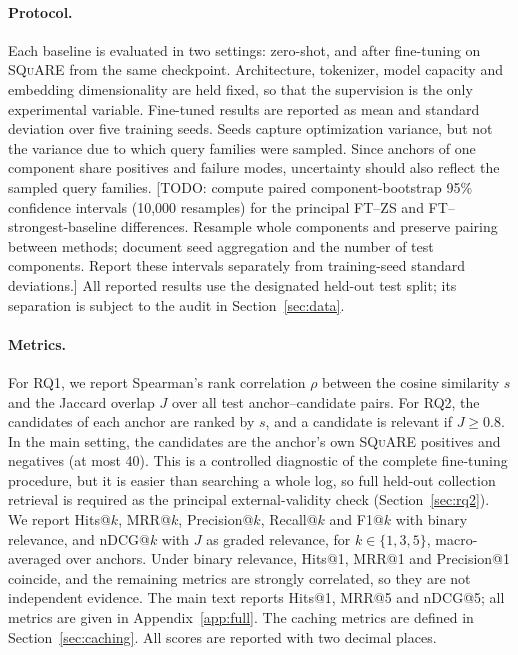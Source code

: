 \documentclass[runningheads]{llncs}
\newcommand{\squareds}{\textsc{SQuARE}}
\newcommand{\hp}[1]{{\color{red!75!black}#1}}
\begin{document}
\paragraph{Protocol.}
Each baseline is evaluated in two settings: zero-shot, and after fine-tuning
on \squareds{} from the same checkpoint. Architecture, tokenizer, model
capacity and embedding dimensionality are held fixed, so that the supervision
is the only experimental variable. Fine-tuned results are reported as mean and
standard deviation over five training seeds. Seeds capture optimization
variance, but not the variance due to which query families were sampled.
Since anchors of one component share positives and failure modes,
uncertainty should also reflect the sampled query families.
\hp{[TODO: compute paired component-bootstrap 95\% confidence intervals
(10,000 resamples) for the principal FT--ZS and FT--strongest-baseline
differences. Resample whole components and preserve pairing between methods;
document seed aggregation and the number of test components. Report these
intervals separately from training-seed standard deviations.]}
All reported results use the designated held-out test split; its separation
is subject to the audit in Section~\ref{sec:data}.

\paragraph{Metrics.}
For RQ1, we report Spearman's rank correlation $\rho$ between the cosine
similarity $s$ and the Jaccard overlap $J$ over all test anchor--candidate
pairs. For RQ2, the candidates of each anchor are ranked by $s$, and a
candidate is relevant if $J \geq 0.8$. In the main setting, the candidates are
the anchor's own \squareds{} positives and negatives (at most 40). This is a
controlled diagnostic of the complete fine-tuning procedure, but it is easier
than searching a whole log, so full held-out collection retrieval is required as the principal
external-validity check (Section~\ref{sec:rq2}). We report Hits@$k$, MRR@$k$,
Precision@$k$, Recall@$k$ and F1@$k$ with binary relevance, and nDCG@$k$ with
$J$ as graded relevance, for $k \in \{1,3,5\}$, macro-averaged over anchors.
Under binary relevance, Hits@1, MRR@1 and Precision@1 coincide, and the
remaining metrics are strongly correlated, so they are not independent
evidence. The main text reports Hits@1, MRR@5 and nDCG@5; all metrics are given in
Appendix~\ref{app:full}. The caching metrics are defined in
Section~\ref{sec:caching}. All scores are reported with two decimal places.
\end{document}
